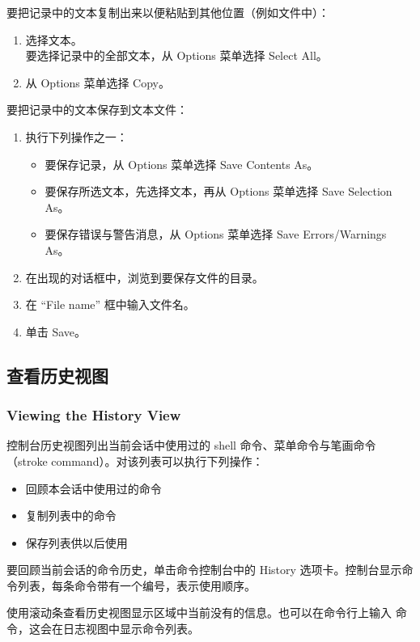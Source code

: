 要把记录中的文本复制出来以便粘贴到其他位置（例如文件中）：
\begin{enumerate}
  \item 选择文本。\\
        要选择记录中的全部文本，从 Options 菜单选择 Select All。
  \item 从 Options 菜单选择 Copy。
\end{enumerate}

要把记录中的文本保存到文本文件：
\begin{enumerate}
  \item 执行下列操作之一：
  \begin{itemize}
    \item 要保存记录，从 Options 菜单选择 Save Contents As。
    \item 要保存所选文本，先选择文本，再从 Options 菜单选择 Save Selection As。
    \item 要保存错误与警告消息，从 Options 菜单选择 Save Errors/Warnings As。
  \end{itemize}
  \item 在出现的对话框中，浏览到要保存文件的目录。
  \item 在 “File name” 框中输入文件名。
  \item 单击 Save。
\end{enumerate}

\subsection{查看历史视图}
\subsubsection*{Viewing the History View}

控制台历史视图列出当前会话中使用过的 shell 命令、菜单命令与笔画命令（stroke command）。对该列表可以执行下列操作：
\begin{itemize}
  \item 回顾本会话中使用过的命令
  \item 复制列表中的命令
  \item 保存列表供以后使用
\end{itemize}

要回顾当前会话的命令历史，单击命令控制台中的 History 选项卡。控制台显示命令列表，每条命令带有一个编号，表示使用顺序。

使用滚动条查看历史视图显示区域中当前没有的信息。也可以在命令行上输入  命令，这会在日志视图中显示命令列表。

